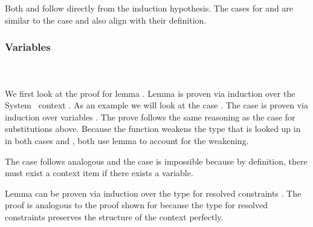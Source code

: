 \noindent Both  and  follow directly from the induction hypothesis. 
The cases for  and  are similar to the case  and also align with their definition.

\subsubsection{Variables}\hfill\\\\
We first look at the proof for lemma . 
Lemma  is proven via induction over the System \Fo\ context . 
\DPTVarPresLookup
As an example we will look at the case   . The case is proven via induction over variables . 
The prove follows the same reasoning as the  case for substitutions above. 
Because the function  weakens the type  that is looked up in  in both cases  and , both use lemma  to account for the weakening. 


\noindent The case    follows analogous and the case  is impossible because by definition, there must exist a context item if there exists a variable.

\noindent Lemma  can be proven via induction over the type for resolved constraints \Data{[}  \Data{]∈} . 
\DPTOVarPresLookup
The proof is analogous to the proof shown for  because the type for resolved constraints preserves the structure of the context  perfectly. 
